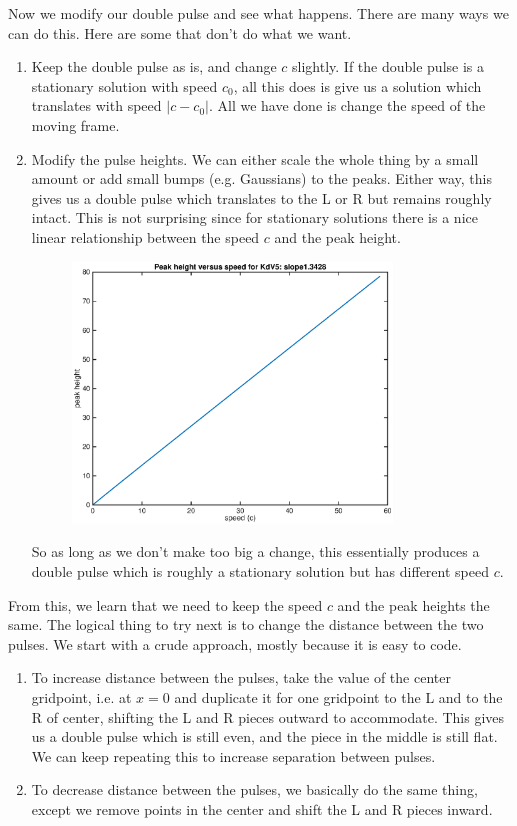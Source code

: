 \documentclass[12pt]{article}
\begin{document}
Now we modify our double pulse and see what happens. There are many ways we can do this. Here are some that don't do what we want.

\begin{enumerate}

	\item Keep the double pulse as is, and change $c$ slightly. If the double pulse is a stationary solution with speed $c_0$, all this does is give us a solution which translates with speed $|c - c_0|$. All we have done is change the speed of the moving frame.
	\item Modify the pulse heights. We can either scale the whole thing by a small amount or add small bumps (e.g. Gaussians) to the peaks. Either way, this gives us a double pulse which translates to the L or R but remains roughly intact. This is not surprising since for stationary solutions there is a nice linear relationship between the speed $c$ and the peak height.
	\begin{figure}[H]
		\includegraphics[width=8.5cm]{peakheights.eps}
	\end{figure}
	So as long as we don't make too big a change, this essentially produces a double pulse which is roughly a stationary solution but has different speed $c$. 

\end{enumerate}

From this, we learn that we need to keep the speed $c$ and the peak heights the same. The logical thing to try next is to change the distance between the two pulses. We start with a crude approach, mostly because it is easy to code.

\begin{enumerate}
	\item To increase distance between the pulses, take the value of the center gridpoint, i.e. at $x = 0$ and duplicate it for one gridpoint to the L and to the R of center, shifting the L and R pieces outward to accommodate. This gives us a double pulse which is still even, and the piece in the middle is still flat. We can keep repeating this to increase separation between pulses.
	\item To decrease distance between the pulses, we basically do the same thing, except we remove points in the center and shift the L and R pieces inward.
\end{enumerate}
\end{document}
